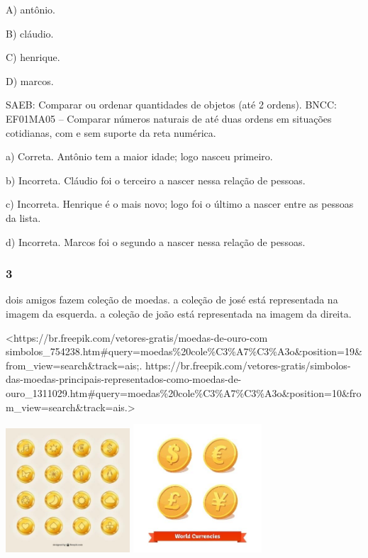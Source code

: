 A) antônio.

B) cláudio.

C) henrique.

D) marcos.

SAEB: Comparar ou ordenar quantidades de objetos (até 2
ordens).
BNCC: EF01MA05 -- Comparar números naturais de até duas ordens em
situações cotidianas, com e sem suporte da reta numérica.

a) Correta. Antônio tem a maior idade; logo nasceu primeiro.

b) Incorreta. Cláudio foi o terceiro a nascer nessa relação de pessoas.

c) Incorreta. Henrique é o mais novo; logo foi o último a nascer entre as pessoas da lista.

d) Incorreta. Marcos foi o segundo a nascer nessa relação de pessoas.

\subsubsection{3}\label{section-104}

dois amigos fazem coleção de moedas. a coleção de josé está representada na imagem da
esquerda. a coleção de joão está representada na imagem da direita.

\textless{}https://br.freepik.com/vetores-gratis/moedas-de-ouro-com
simbolos\_754238.htm\#query=moedas\%20cole\%C3\%A7\%C3\%A3o\&position=19\&from\_view=search\&track=ais;.
https://br.freepik.com/vetores-gratis/simbolos-das-moedas-principais-representados-como-moedas-de-ouro\_1311029.htm\#query=moedas\%20cole\%C3\%A7\%C3\%A3o\&position=10\&from\_view=search\&track=ais.\textgreater{}

\includegraphics[width=1.82292in,height=1.82292in]{media/image111.jpg}
\includegraphics[width=1.88542in,height=1.88542in]{media/image112.jpg}

